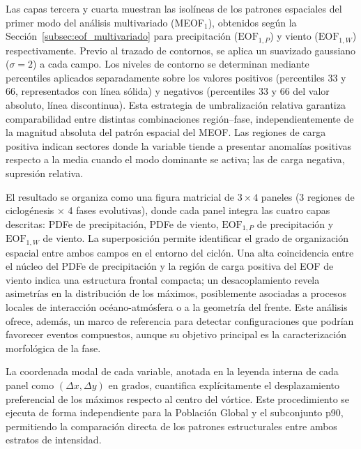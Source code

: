Las capas tercera y cuarta muestran las isolíneas de los patrones espaciales del primer modo del análisis multivariado (MEOF$_1$), obtenidos según la Sección~\ref{subsec:eof_multivariado} para precipitación ($\text{EOF}_{1,P}$) y viento ($\text{EOF}_{1,W}$) respectivamente. Previo al trazado de contornos, se aplica un suavizado gaussiano ($\sigma = 2$) a cada campo. Los niveles de contorno se determinan mediante percentiles aplicados separadamente sobre los valores positivos (percentiles 33 y 66, representados con línea sólida) y negativos (percentiles 33 y 66 del valor absoluto, línea discontinua). Esta estrategia de umbralización relativa garantiza comparabilidad entre distintas combinaciones región--fase, independientemente de la magnitud absoluta del patrón espacial del MEOF. Las regiones de carga positiva indican sectores donde la variable tiende a presentar anomalías positivas respecto a la media cuando el modo dominante se activa; las de carga negativa, supresión relativa.

El resultado se organiza como una figura matricial de $3 \times 4$ paneles (3 regiones de ciclogénesis $\times$ 4 fases evolutivas), donde cada panel integra las cuatro capas descritas: PDFe de precipitación, PDFe de viento, $\text{EOF}_{1,P}$ de precipitación y $\text{EOF}_{1,W}$ de viento. La superposición permite identificar el grado de organización espacial entre ambos campos en el entorno del ciclón. Una alta coincidencia entre el núcleo del PDFe de precipitación y la región de carga positiva del EOF de viento indica una estructura frontal compacta; un desacoplamiento revela asimetrías en la distribución de los máximos, posiblemente asociadas a procesos locales de interacción océano-atmósfera o a la geometría del frente. Este análisis ofrece, además, un marco de referencia para detectar configuraciones que podrían favorecer eventos compuestos, aunque su objetivo principal es la caracterización morfológica de la fase.

La coordenada modal de cada variable, anotada en la leyenda interna de cada panel como $(\Delta x, \Delta y)$ en grados, cuantifica explícitamente el desplazamiento preferencial de los máximos respecto al centro del vórtice. Este procedimiento se ejecuta de forma independiente para la Población Global y el subconjunto p90, permitiendo la comparación directa de los patrones estructurales entre ambos estratos de intensidad.
